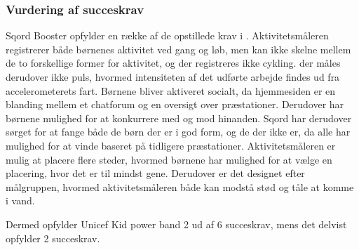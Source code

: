 \subsubsection{Vurdering af succeskrav}
Sqord Booster opfylder en række af de opstillede krav i . Aktivitetsmåleren registrerer både børnenes aktivitet ved gang og løb, men kan ikke skelne mellem de to forskellige former for aktivitet, og der registreres ikke cykling. der måles derudover ikke puls, hvormed intensiteten af det udførte arbejde findes ud fra accelerometerets fart. 
Børnene bliver aktiveret socialt, da hjemmesiden er en blanding mellem et chatforum og en oversigt over præstationer. Derudover har børnene mulighed for at konkurrere med og mod hinanden. Sqord har derudover sørget for at fange både de børn der er i god form, og de der ikke er, da alle har mulighed for at vinde baseret på tidligere præstationer. Aktivitetsmåleren er mulig at placere flere steder, hvormed børnene har mulighed for at vælge en placering, hvor det er til mindst gene. Derudover er det designet efter målgruppen, hvormed aktivitetsmåleren både kan modstå stød og tåle at komme i vand.  

Dermed opfylder Unicef Kid power band 2 ud af 6 succeskrav, mens det delvist opfylder 2 succeskrav.